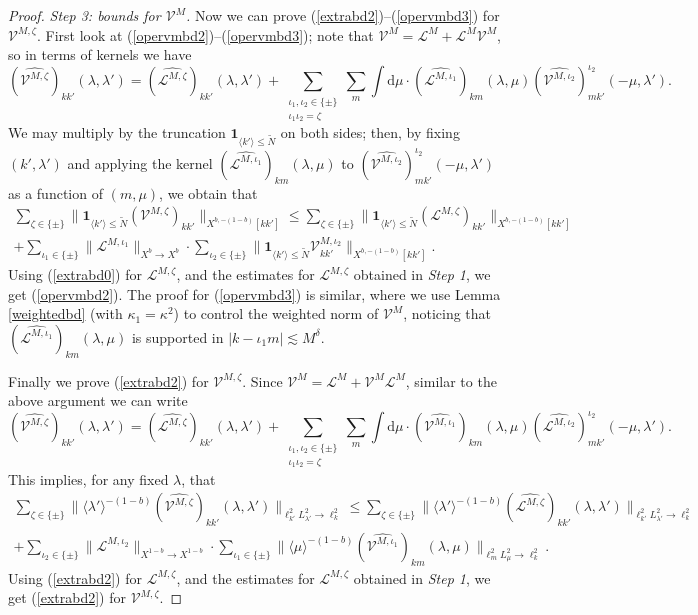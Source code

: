 \documentclass[11 pt,reqno]{amsart}
\theoremstyle{definition}
\theoremstyle{remark}
\numberwithin{equation}{section}
\newcommand{\Ls}{\mathscr{L}}
\newcommand{\Vs}{\mathscr{V}}
\begin{document}
{\begin{proof}
\emph{Step 3: bounds for $\Vs^M$.} Now we can prove (\ref{extrabd2})--(\ref{opervmbd3}) for $\Vs^{M,\zeta}$. First look at (\ref{opervmbd2})--(\ref{opervmbd3}); note that $\Vs^M=\Ls^M+\Ls^M\Vs^M$, so in terms of kernels we have
\[(\widehat{\Vs^{M,\zeta}})_{kk'}(\lambda,\lambda')=(\widehat{\Ls^{M,\zeta}})_{kk'}(\lambda,\lambda')+\sum_{\substack{\iota_1,\iota_2\in\{\pm\}\\\iota_1\iota_2=\zeta}}\sum_{m}\int\mathrm{d}\mu\cdot(\widehat{\Ls^{M,\iota_1}})_{km}(\lambda,\mu)(\widehat{\Vs^{M,\iota_2}})_{m k'}^{\iota_2}(-\mu,\lambda').\] We may multiply by the truncation $\mathbf{1}_{\langle k'\rangle\leq \widetilde{N}}$ on both sides; then, by fixing $(k',\lambda')$ and applying the kernel $(\widehat{\Ls^{M,\iota_1}})_{km}(\lambda,\mu)$ to $(\widehat{\Vs^{M,\iota_2}})_{m k'}^{\iota_2}(-\mu,\lambda')$ as a function of $(m, \mu)$, we obtain that
\begin{multline}\sum_{\zeta\in\{\pm\}}\|\mathbf{1}_{\langle k'\rangle\leq \widetilde{N}}(\Vs^{M,\zeta})_{kk'}\|_{X^{b,-(1-b)}[kk']}\leq \sum_{\zeta\in\{\pm\}}\|\mathbf{1}_{\langle k'\rangle\leq \widetilde{N}}(\Ls^{M,\zeta})_{kk'}\|_{X^{b,-(1-b)}[kk']}\\+\sum_{\iota_1\in\{\pm\}}\|\Ls^{M,\iota_1}\|_{X^b\to X^b}\cdot\sum_{\iota_2\in\{\pm\}}\|\mathbf{1}_{\langle k'\rangle\leq  \widetilde{N}}\Vs_{kk'}^{M,\iota_2}\|_{X^{b,-(1-b)}[kk']}.\end{multline} Using (\ref{extrabd0}) for $\Ls^{M,\zeta}$, and the estimates for $\Ls^{M,\zeta}$ obtained in \emph{Step 1}, we get (\ref{opervmbd2}). The proof for (\ref{opervmbd3}) is similar, where we use Lemma \ref{weightedbd} (with $\kappa_1=\kappa^2$) to control the weighted norm of $\Vs^M$, noticing that $(\widehat{\Ls^{M,\iota_1}})_{km}(\lambda,\mu)$ is supported in $|k-\iota_1m|\lesssim M^\delta$.

Finally we prove (\ref{extrabd2}) for $\Vs^{M,\zeta}$. Since $\Vs^M=\Ls^M+\Vs^M\Ls^M$, similar to the above argument we can write \[(\widehat{\Vs^{M,\zeta}})_{kk'}(\lambda,\lambda')=(\widehat{\Ls^{M,\zeta}})_{kk'}(\lambda,\lambda')+\sum_{\substack{\iota_1,\iota_2\in\{\pm\}\\\iota_1\iota_2=\zeta}}\sum_{m}\int\mathrm{d}\mu\cdot(\widehat{\Vs^{M,\iota_1}})_{km}(\lambda,\mu)(\widehat{\Ls^{M,\iota_2}})_{m k'}^{\iota_2}(-\mu,\lambda').\] This implies, for any fixed $\lambda$, that
\begin{multline}\sum_{\zeta\in\{\pm\}}\|\langle\lambda'\rangle^{-(1-b)}(\widehat{\Vs^{M,\zeta}})_{kk'}(\lambda,\lambda')\|_{\ell_{k'}^2L_{\lambda'}^2\to \ell_k^2}\leq\sum_{\zeta\in\{\pm\}}\|\langle\lambda'\rangle^{-(1-b)}(\widehat{\Ls^{M,\zeta}})_{kk'}(\lambda,\lambda')\|_{\ell_{k'}^2L_{\lambda'}^2\to \ell_k^2}\\+\sum_{\iota_2\in\{\pm\}}\|\Ls^{M,\iota_2}\|_{X^{1-b}\to X^{1-b}}\cdot\sum_{\iota_1\in\{\pm\}}\|\langle\mu\rangle^{-(1-b)}(\widehat{\Vs^{M,\iota_1}})_{km}(\lambda,\mu)\|_{\ell_{m}^2L_{\mu}^2\to \ell_k^2}.
\end{multline} Using (\ref{extrabd2}) for $\Ls^{M,\zeta}$, and the estimates for $\Ls^{M,\zeta}$ obtained in \emph{Step 1}, we get (\ref{extrabd2}) for $\Vs^{M,\zeta}$.
\end{proof}
}
\end{document}
